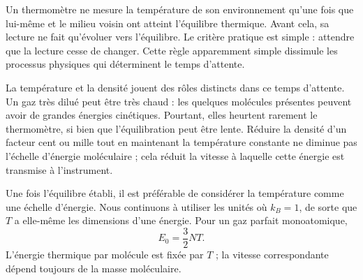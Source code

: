 Un thermomètre ne mesure la température de son environnement qu’une fois que lui-même et le milieu voisin ont atteint l’équilibre thermique. Avant cela, sa lecture ne fait qu’évoluer vers l’équilibre. Le critère pratique est simple : attendre que la lecture cesse de changer. Cette règle apparemment simple dissimule les processus physiques qui déterminent le temps d’attente.

\begin{classroomqa}
\end{classroomqa}

La température et la densité jouent des rôles distincts dans ce temps d’attente. Un gaz très dilué peut être très chaud : les quelques molécules présentes peuvent avoir de grandes énergies cinétiques. Pourtant, elles heurtent rarement le thermomètre, si bien que l’équilibration peut être lente. Réduire la densité d’un facteur cent ou mille tout en maintenant la température constante ne diminue pas l’échelle d’énergie moléculaire ; cela réduit la vitesse à laquelle cette énergie est transmise à l’instrument.

\begin{classroomqa}
\end{classroomqa}

Une fois l’équilibre établi, il est préférable de considérer la température comme une échelle d’énergie. Nous continuons à utiliser les unités où \(k_B=1\), de sorte que \(T\) a elle-même les dimensions d’une énergie. Pour un gaz parfait monoatomique,
\begin{equation}
 E_0=\frac{3}{2}NT.
 \label{eq:sm6-ideal-energy}
\end{equation}
L’énergie thermique par molécule est fixée par \(T\) ; la vitesse correspondante dépend toujours de la masse moléculaire.

